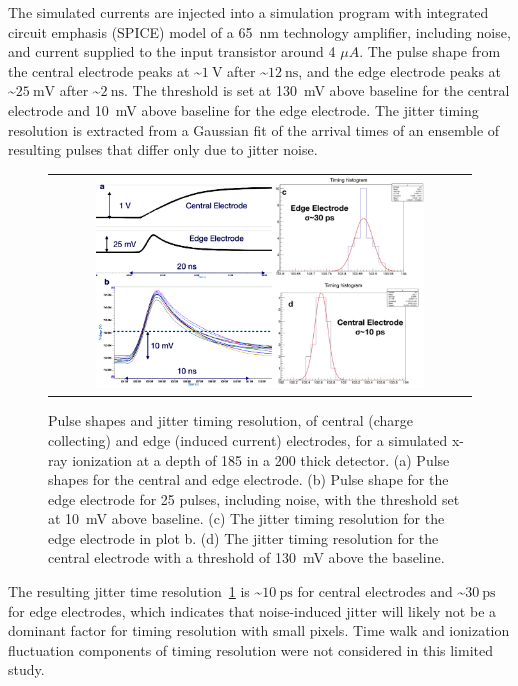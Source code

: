 \begin{refsection}
The simulated currents are injected into a simulation program with integrated circuit emphasis (SPICE) model of a \SI{65}{\nm} technology amplifier, including noise, and current supplied to the input transistor around 4 $\mu A$.
The pulse shape from the central electrode peaks at \sim$\SI{1}{\V}$ after \sim$\SI{12}{\ns}$, and the edge electrode peaks at \sim$\SI{25}{\mV}$ after \sim$\SI{2}{\ns}$.
The threshold is set at \SI{130}{\mV} above baseline for the central electrode and \SI{10}{\mV} above baseline for the edge electrode.
The jitter timing resolution is extracted from a Gaussian fit of the arrival times of an ensemble of resulting pulses that differ only due to jitter noise.
\begin{figure}[htb]
  \begin{center}
    \begin{tabular}{c}
      \includegraphics[width=0.80\textwidth]{fig_FastTiming/TimingResolutions.png}
    \end{tabular}
    \caption{Pulse shapes and jitter timing resolution, of central (charge collecting) and edge (induced current) electrodes, for a simulated x-ray ionization at a depth of \SI{185}{\micron} in a \SI{200}{\micron} thick detector.
        (a) Pulse shapes for the central and edge electrode. 
        (b) Pulse shape for the edge electrode for 25 pulses, including noise, with the threshold set at \SI{10}{\mV} above baseline.
        (c) The jitter timing resolution for the edge electrode in plot b.
        (d) The jitter timing resolution for the central electrode with a threshold of \SI{130}{\mV} above the baseline.
            }
    \label{TimingResolutions}
  \end{center}
\end{figure}

The resulting jitter time resolution~\ref{TimingResolutions} is \sim$\SI{10}{\ps}$ for central electrodes and \sim$\SI{30}{\ps}$ for edge electrodes, which indicates that noise-induced jitter will likely not be a dominant factor for timing resolution with small pixels.
Time walk and ionization fluctuation components of timing resolution were not considered in this limited study.


\end{refsection}
